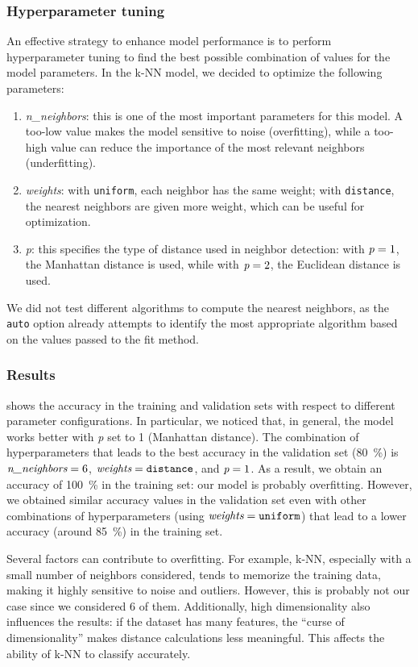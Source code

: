 \documentclass[acmlarge,nonacm]{acmart}
\begin{document}
\subsubsection{Hyperparameter tuning} 
An effective strategy to enhance model performance is to perform hyperparameter tuning to find the best possible combination of values for the model parameters. In the k-NN model, we decided to optimize the following parameters:
\begin{enumerate}
    \item \emph{n\_neighbors}: this is one of the most important parameters for this model. A too-low value makes the model sensitive to noise (overfitting), while a too-high value can reduce the importance of the most relevant neighbors (underfitting).
    \item \emph{weights}: with \verb|uniform|, each neighbor has the same weight; with \verb|distance|, the nearest neighbors are given more weight, which can be useful for optimization.
    \item \emph{p}: this specifies the type of distance used in neighbor detection: with $\emph{p}=1$, the Manhattan distance is used, while with $\emph{p}=2$, the Euclidean distance is used.
\end{enumerate}
We did not test different algorithms to compute the nearest neighbors, as the \verb|auto| option already attempts to identify the most appropriate algorithm based on the values passed to the fit method.

\subsubsection{Results} 
 shows the accuracy in the training and validation sets with respect to different parameter configurations. In particular, we noticed that, in general, the model works better with \emph{p} set to 1 (Manhattan distance). The combination of hyperparameters that leads to the best accuracy in the validation set (\SI{80}{\percent}) is $\emph{n\_neighbors}=6$, $\emph{weights}=\verb|distance|$, and $\emph{p}=1$. As a result, we obtain an accuracy of \SI{100}{\percent} in the training set: our model is probably overfitting. However, we obtained similar accuracy values in the validation set even with other combinations of hyperparameters (using $\emph{weights}=\verb|uniform|$) that lead to a lower accuracy (around \SI{85}{\percent}) in the training set.

Several factors can contribute to overfitting. For example, k-NN, especially with a small number of neighbors considered, tends to memorize the training data, making it highly sensitive to noise and outliers. However, this is probably not our case since we considered 6 of them. Additionally, high dimensionality also influences the results: if the dataset has many features, the ``curse of dimensionality'' makes distance calculations less meaningful. This affects the ability of k-NN to classify accurately.
\end{document}
